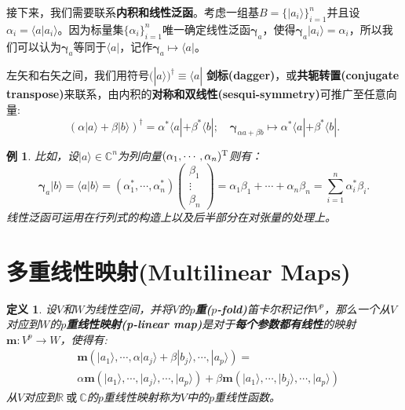 \documentclass[mathserif,hyperref,UTF8,openany,b5paper]{ctexbook}
\newtheorem{exmp}{例}[section]
\newtheorem{defn}{定义}[section]
\begin{document}
接下来，我们需要联系\textbf{内积和线性泛函}。考虑一组基$B=\{|a_i\rangle\}^n_{i=1}$并且设$\alpha_i=\langle a|a_i\rangle$。因为标量集$\{\alpha_i\}^n_{i=1}$唯一确定线性泛函$\boldsymbol{\gamma}_a$，使得$\boldsymbol{\gamma}_a|a_i\rangle=\alpha_i$，所以我们可以认为$\boldsymbol{\gamma}_a$等同于$\langle a|$，记作$\boldsymbol{\gamma}_a \mapsto \langle a|$。

左矢和右矢之间，我们用符号$(|a\rangle)^\dagger\equiv\langle a|$ \textbf{剑标(dagger)}，或\textbf{共轭转置(conjugate transpose)}来联系，由内积的\textbf{对称和双线性(sesqui-symmetry)}可推广至任意向量:
\begin{equation}
    (\alpha|a\rangle+\beta|b\rangle)^{\dagger}=\alpha^*\langle a|+\beta^*\langle b|;\quad \boldsymbol{\gamma}_{\alpha a+\beta b}\mapsto \alpha^*\langle a|+\beta^*\langle b|.
\end{equation}
\begin{exmp}
比如，设$|a\rangle\in \mathbb{C}^n$为列向量$(\alpha_1,\cdots,\alpha_n)^{\rm T}$则有：
\begin{equation}
\boldsymbol{\gamma}_a|b\rangle=\langle a|b\rangle=(\alpha_1^*,\cdots,\alpha_n^*)\begin{pmatrix}
           \beta_{1} \\
           \vdots \\
           \beta_{n}
         \end{pmatrix} = \alpha_1\beta_1+\cdots+\alpha_n\beta_n=\sum^n_{i=1}\alpha_i^*\beta_i.
\end{equation}
线性泛函可运用在行列式的构造上以及后半部分在对张量的处理上。
\end{exmp}
\section{多重线性映射(Multilinear Maps)}
\begin{defn}
设$V$和$W$为线性空间，并将$V$的\textbf{$p$重($p$-fold)}笛卡尔积记作$V^p$，那么一个从$V$对应到$W$的\textbf{$p$重线性映射(p-linear map)}是对于\textbf{每个参数都有线性}的映射$\mathbf{m}:V^p\xrightarrow{}W$，使得有:
\begin{align}
&\mathbf{m}(|a_1\rangle,\cdots,\alpha|a_j\rangle+\beta|b_j\rangle,\cdots,|a_p\rangle)=\\
&\alpha\mathbf{m}(|a_1\rangle,\cdots,|a_j\rangle,\cdots,|a_p\rangle)+\beta\mathbf{m}(|a_1\rangle,\cdots,|b_j\rangle,\cdots,|a_p\rangle)
\end{align}
从$V$对应到$\mathbb{R}\ \mbox{或}\ \mathbb{C}$的$p$重线性映射称为$V$中的$p$重线性函数。
\end{defn}
\end{document}
